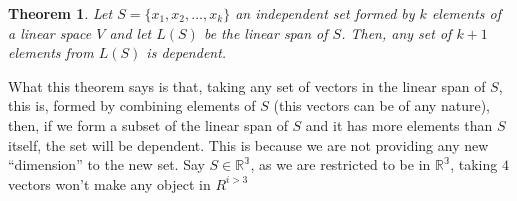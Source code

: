 \documentclass{book}
\newtheorem{theorem}{Theorem}[section]
\begin{document}
\begin{theorem}
    Let $S=\{x_1,x_2,\dots,x_k\}$ an independent set formed by $k$ elements
    of a linear space $V$ and let $L(S)$ be the linear span of $S$. Then, any
    set of $k+1$ elements from $L(S)$ is dependent.
\end{theorem}

What this theorem says is that, taking any set of vectors in the linear span of
$S$, this is, formed by combining elements of $S$ (this vectors can be of any
nature), then, if we form a subset of the linear span of $S$ and it has more
elements than $S$ itself, the set will be dependent. This is because we are not
providing any new ``dimension'' to the new set. Say $S\in \mathbb{R^{3}}$, as
we are restricted to be in $\mathbb{R^{3}}$, taking $4$ vectors won't make any
object in $R^{i>3}$
\end{document}
